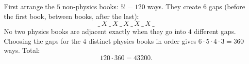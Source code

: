 First arrange the $5$ non-physics books: $5!=120$ ways. They create $6$ gaps (before the first book, between books, after the last):
\[
\_\ X\ \_\ X\ \_\ X\ \_\ X\ \_\ X\ \_
\]
No two physics books are adjacent exactly when they go into $4$ different gaps. Choosing the gaps for the $4$ distinct physics books in order gives $6\cdot5\cdot4\cdot3=360$ ways. Total:
\[
120\cdot360=\boxed{43200}.
\]
